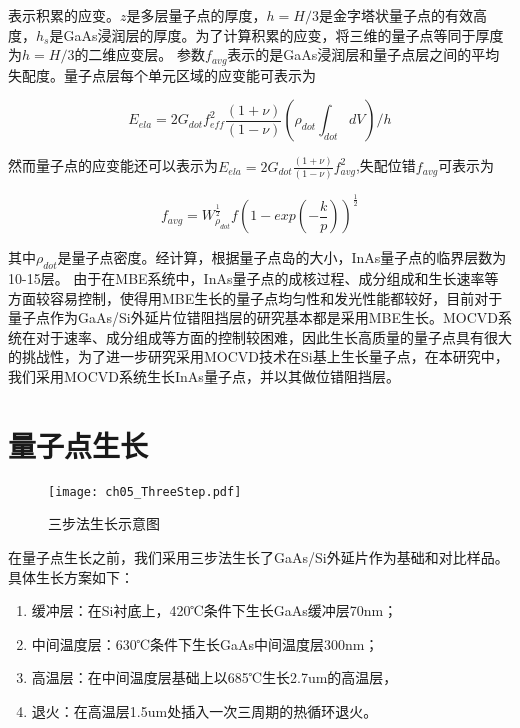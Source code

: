 表示积累的应变。$z$是多层量子点的厚度，$h=H/3$是金字塔状量子点的有效高度，$h_s$是GaAs浸润层的厚度。为了计算积累的应变，将三维的量子点等同于厚度为$h=H/3$的二维应变层。
参数$f_{avg}$表示的是GaAs浸润层和量子点层之间的平均失配度。量子点层每个单元区域的应变能可表示为

\begin{equation}
	\label{eq:Eela}
	E_{ela} = 2G_{dot}f_{eff}^2 \frac{(1+\nu)}{(1-\nu)}(\rho_{dot}\int_{dot}{}dV)/h
\end{equation}

然而量子点的应变能还可以表示为$E_{ela}=2G_{dot}\frac{(1+\nu)}{(1-\nu)}f_{avg}^2$,失配位错$f_{avg}$可表示为

\begin{equation}
	\label{eq:f_avg}
	f_{avg} = W_{\rho_{dot}}^{\frac{1}{2}} f(1-exp(-\frac{k}{p}))^{\frac{1}{2}}
\end{equation}

其中$\rho_{dot}$是量子点密度。经计算，根据量子点岛的大小，InAs量子点的临界层数为10-15层。
由于在MBE系统中，InAs量子点的成核过程、成分组成和生长速率等方面较容易控制，使得用MBE生长的量子点均匀性和发光性能都较好，目前对于量子点作为GaAs/Si外延片位错阻挡层的研究基本都是采用MBE生长。MOCVD系统在对于速率、成分组成等方面的控制较困难，因此生长高质量的量子点具有很大的挑战性，为了进一步研究采用MOCVD技术在Si基上生长量子点，在本研究中，我们采用MOCVD系统生长InAs量子点，并以其做位错阻挡层。

\section{量子点生长}

\begin{figure}[ht]
	\centering
	\texttt{[image: ch05\_ThreeStep.pdf]}
	\caption{三步法生长示意图}
	\label{fig:ThreeStep}
\end{figure}

在量子点生长之前，我们采用三步法生长了GaAs/Si外延片作为基础和对比样品。具体生长方案如下：

\begin{enumerate}[(1)]
	\setlength{\itemsep}{-3pt}
	\item 缓冲层：在Si衬底上，420℃条件下生长GaAs缓冲层70nm；
	\item 中间温度层：630℃条件下生长GaAs中间温度层300nm；
	\item 高温层：在中间温度层基础上以685℃生长2.7um的高温层，
	\item 退火：在高温层1.5um处插入一次三周期的热循环退火。
\end{enumerate}

